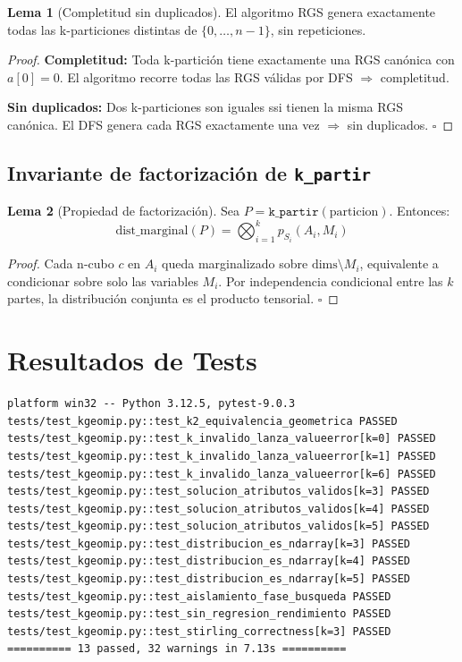 \documentclass[12pt,letterpaper]{article}
\theoremstyle{definition}
\newtheorem{lemma}{Lema}[section]
\theoremstyle{remark}
\begin{document}
\begin{lemma}[Completitud sin duplicados]
El algoritmo RGS genera exactamente todas las k-particiones distintas de
$\{0, \ldots, n-1\}$, sin repeticiones.
\end{lemma}

\begin{proof}
\textbf{Completitud:} Toda k-partición tiene exactamente una RGS canónica con $a[0] = 0$.
El algoritmo recorre todas las RGS válidas por DFS $\Rightarrow$ completitud.

\textbf{Sin duplicados:} Dos k-particiones son iguales ssi tienen la misma RGS canónica.
El DFS genera cada RGS exactamente una vez $\Rightarrow$ sin duplicados. $\square$
\end{proof}

\subsection{Invariante de factorización de \texttt{k\_partir}}

\begin{lemma}[Propiedad de factorización]
Sea $P = \texttt{k\_partir}(\mathrm{particion})$. Entonces:
\begin{equation}
  \mathrm{dist\_marginal}(P) = \bigotimes_{i=1}^{k} p_{S_i}(A_i, M_i)
\end{equation}
\end{lemma}

\begin{proof}
Cada n-cubo $c$ en $A_i$ queda marginalizado sobre $\mathrm{dims} \setminus M_i$,
equivalente a condicionar sobre solo las variables $M_i$.
Por independencia condicional entre las $k$ partes, la distribución conjunta es el
producto tensorial. $\square$
\end{proof}

\section{Resultados de Tests}
\label{apx:tests}

\begin{lstlisting}[style=pseudocode,
  caption={Salida de la suite de 13 tests},label=lst:tests]
platform win32 -- Python 3.12.5, pytest-9.0.3
tests/test_kgeomip.py::test_k2_equivalencia_geometrica PASSED
tests/test_kgeomip.py::test_k_invalido_lanza_valueerror[k=0] PASSED
tests/test_kgeomip.py::test_k_invalido_lanza_valueerror[k=1] PASSED
tests/test_kgeomip.py::test_k_invalido_lanza_valueerror[k=6] PASSED
tests/test_kgeomip.py::test_solucion_atributos_validos[k=3] PASSED
tests/test_kgeomip.py::test_solucion_atributos_validos[k=4] PASSED
tests/test_kgeomip.py::test_solucion_atributos_validos[k=5] PASSED
tests/test_kgeomip.py::test_distribucion_es_ndarray[k=3] PASSED
tests/test_kgeomip.py::test_distribucion_es_ndarray[k=4] PASSED
tests/test_kgeomip.py::test_distribucion_es_ndarray[k=5] PASSED
tests/test_kgeomip.py::test_aislamiento_fase_busqueda PASSED
tests/test_kgeomip.py::test_sin_regresion_rendimiento PASSED
tests/test_kgeomip.py::test_stirling_correctness[k=3] PASSED
========== 13 passed, 32 warnings in 7.13s ==========
\end{lstlisting}
\end{document}
